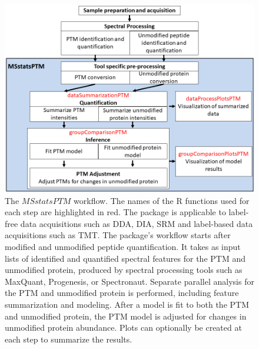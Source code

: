 \documentclass[mcp]{article}
\numberwithin{table}{section}
\begin{document}
\begin{figure}[ht]
\centering
\includegraphics[scale=.6]{images/MSstatsPTM_design.png}
\caption{The $MSstatsPTM$ workflow. The names of the R functions used for each step are highlighted in red. The package is applicable to label-free data acquisitions such as DDA, DIA, SRM and label-based data acquisitions such as TMT. The package's workflow starts after modified and unmodified peptide quantification. It takes as input lists of identified and quantified spectral features for the PTM and unmodified protein, produced by spectral processing tools such as MaxQuant, Progenesis, or Spectronaut. Separate parallel analysis for the PTM and unmodified protein is performed, including feature summarization and modeling. After a model is fit to both the PTM and unmodified protein, the PTM model is adjusted for changes in unmodified protein abundance. Plots can optionally be created at each step to summarize the results.}
\label{fig:msstatsptm_design}
\end{figure}
\end{document}
